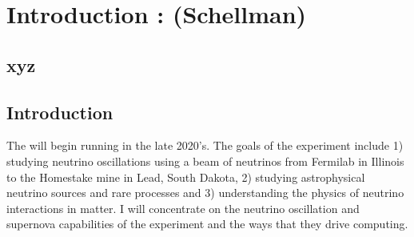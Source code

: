 














\chapter{Introduction : (Schellman) }
\label{ch:intro}

\section{xyz}
\label{sec:intro:xyz}  %


\section{Introduction}

The   will begin running in the late 2020's.  The goals of the experiment include 1) studying neutrino oscillations using a beam of neutrinos from Fermilab in Illinois to the Homestake mine in Lead, South Dakota, 2) studying  astrophysical neutrino sources and rare processes and 3) understanding  the physics of neutrino interactions in matter.   I will concentrate on the neutrino oscillation and supernova capabilities of the experiment and the ways that they drive computing. 

